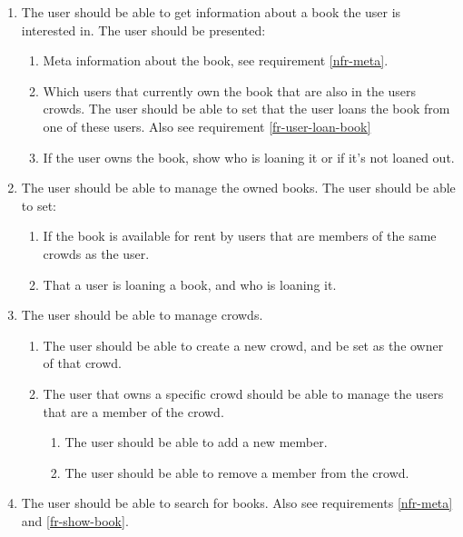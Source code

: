 \begin{enumerate}[label= {\bf FR \arabic*}]
    \item The user should be able to get information about a book the user is interested in. The user should be presented: \label{fr-show-book}
        \begin{enumerate}
            \item Meta information about the book, see requirement \ref{nfr-meta}.
            \item Which users that currently own the book that are also in the users crowds. The user should be able to set that the user loans the book from one of these users. Also see requirement \ref{fr-user-loan-book}
            \item If the user owns the book, show who is loaning it or if it's not loaned out. 
        \end{enumerate}
        
    \item The user should be able to manage the owned books. The user should be able to set:
        \begin{enumerate}
            \item If the book is available for rent by users that are members of the same crowds as the user.
            \item That a user is loaning a book, and who is loaning it.
        \end{enumerate}
        
    \item The user should be able to manage crowds. 
        \label{fr-crowds}
        \begin{enumerate}
        \item The user should be able to create a new crowd, and be set as the owner of that crowd.
        \item The user that owns a specific crowd should be able to manage the users that are a member of the crowd.
            \begin{enumerate}
                \item The user should be able to add a new member.
                \item The user should be able to remove a member from the crowd.
            \end{enumerate}
        \end{enumerate}

        \item The user should be able to search for books. Also see requirements \ref{nfr-meta} and \ref{fr-show-book}.
\end{enumerate}

